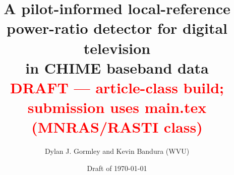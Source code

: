 \documentclass[11pt]{article}
\title{A pilot-informed local-reference power-ratio detector for digital television\\
in CHIME baseband data\\
\large\textcolor{red}{DRAFT --- article-class build; submission uses main.tex (MNRAS/RASTI class)}}
\author{Dylan J. Gormley and Kevin Bandura (WVU)}
\date{Draft of \today}
\begin{document}
\maketitle

\begin{abstract}

\end{abstract}






\appendix

\end{document}
